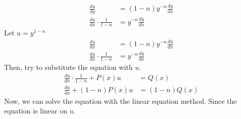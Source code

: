 \begin{equation}
  \nonumber
  \begin{aligned}
    \frac{du}{dy}&=(1-n){y^{-n}}\frac{dy}{dx} \\
    \frac{du}{dx} \cdot \frac{1}{1-n}&=y^{-n}\frac{dy}{dx}
  \end{aligned}
\end{equation}
Let $u = y^{1-n}$
\begin{equation}
  \nonumber
  \begin{aligned}
    \frac{du}{dx} &= (1-n)y^{-n}\frac{dy}{dx} \\
    \frac{du}{dx} \cdot \frac{1}{1-n} &= y^{-n} \frac{dy}{dx}
  \end{aligned}
\end{equation}
Then, try to substitute the equation with $u$.
\begin{equation}
  \nonumber
  \begin{aligned}
    \frac{du}{dx} \cdot \frac{1}{1-n} + P(x)u &= Q(x) \\
    \frac{du}{dx} + (1-n)P(x)u &= (1-n)Q(x)
  \end{aligned}
\end{equation}
Now, we can solve the equation with the linear equation method. Since the equation is linear on $u$.
